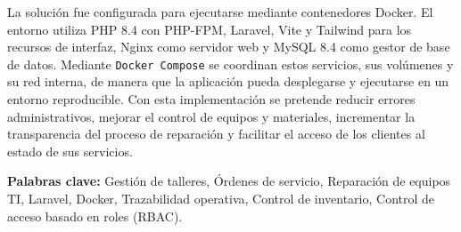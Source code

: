 La solución fue configurada para ejecutarse mediante contenedores Docker. El entorno utiliza PHP 8.4 con PHP-FPM, Laravel, Vite y Tailwind para los recursos de interfaz, Nginx como servidor web y MySQL 8.4 como gestor de base de datos. Mediante \texttt{Docker Compose} se coordinan estos servicios, sus volúmenes y su red interna, de manera que la aplicación pueda desplegarse y ejecutarse en un entorno reproducible. Con esta implementación se pretende reducir errores administrativos, mejorar el control de equipos y materiales, incrementar la transparencia del proceso de reparación y facilitar el acceso de los clientes al estado de sus servicios.

\vspace{0.5cm}
\noindent\textbf{Palabras clave:} Gestión de talleres, Órdenes de servicio, Reparación de equipos TI, Laravel, Docker, Trazabilidad operativa, Control de inventario, Control de acceso basado en roles (RBAC).
